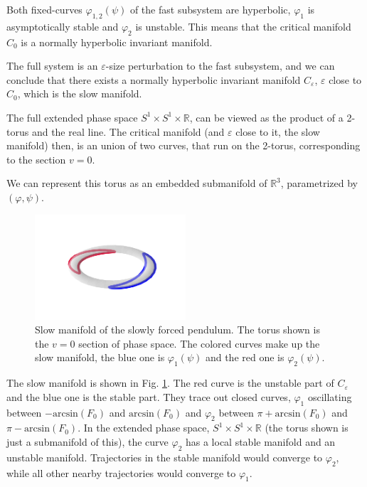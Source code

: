 \documentclass[a4paper,11pt,pdftex]{article}
\begin{document}
Both fixed-curves $\varphi_{1,2}(\psi)$ of the fast subsystem are hyperbolic, $\varphi_1$ is asymptotically stable and $\varphi_2$ is unstable. This means that the critical manifold $C_0$ is a normally hyperbolic invariant manifold. 

The full system is an $\varepsilon$-size perturbation to the fast subsystem, and we can conclude that there exists a normally hyperbolic invariant manifold $C_\varepsilon$, $\varepsilon$ close to $C_0$, which is the slow manifold. 

The full extended phase space $S^1 \times S^1 \times \mathbb{R}$, can be viewed as the product of a 2-torus and the real line. The critical manifold (and $\varepsilon$ close to it, the slow manifold) then, is an union of two curves, that run on the 2-torus, corresponding to the section $v=0$. 

We can represent this torus as an embedded submanifold of $\mathbb{R}^3$, parametrized by $(\varphi, \psi)$. 

\begin{figure}[h]
    \centering
    \includegraphics[width = 0.5\textwidth]{torus.png}
    \caption{Slow manifold of the slowly forced pendulum. The torus shown is the $v=0$ section of phase space. The colored curves make up the slow manifold, the blue one is $\varphi_1(\psi)$ and the red one is $\varphi_2(\psi)$. }
    \label{fig:t}
\end{figure}
The slow manifold is shown in Fig. \ref{fig:t}. The red curve is the unstable part of $C_\varepsilon$ and the blue one is the stable part. 
They trace out closed curves, $\varphi_1$ oscillating between $-\text{arcsin}(F_0)$ and $\text{arcsin}(F_0)$ and $\varphi_2$ between $\pi + \text{arcsin}(F_0)$ and $\pi-\text{arcsin}(F_0)$. 
In the extended phase space, $S^1 \times S^1 \times \mathbb{R}$ (the torus shown is just a submanifold of this), 
the curve $\varphi_2$ has a local stable manifold and an unstable manifold. Trajectories in the stable manifold would converge to $\varphi_2$, while all other nearby trajectories would converge to $\varphi_1$. 
\end{document}
